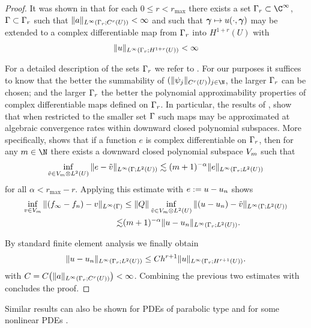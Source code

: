\begin{proof}
	
	It was shown in \cite[Theorem 4.1 \& Section 5]{ChkifaCohenSchwab2015} that for each $0\leq r<r_{\max}$ there exists a set $\domPS_{r}\subset \C^{\infty}$, $\Gamma\subset \Gamma_{r}$ such that
	$\|a\|_{L^{\infty}(\Gamma_{r};C^{r}(U))}<\infty$ and such that $\bm{\gamma}\mapsto u(\cdot,\bm{\gamma})$ may be extended to a complex differentiable map from $\Gamma_{r}$ into $H^{1+r}(U)$ with
		\begin{equation}
		\label{eq:complexbounds}
		\begin{split}
	\|u\|_{L^{\infty}(\Gamma_{r};H^{1+r}(U))}<\infty
		\end{split}
		\end{equation}
	
For a detailed description of the sets $\Gamma_{r}$ we refer to \cite{ChkifaCohenSchwab2015}. For our purposes it suffices to know that the better the summability of $(\norm{\psi_j}{C^{r}(U)})_{j\in\N}$, the larger $\Gamma_{r}$ can be chosen; and the larger $\Gamma_{r}$ the better the polynomial approximability properties of complex differentiable maps defined on $\Gamma_{r}$.
In particular, the results of \cite[Section 2]{ChkifaCohenSchwab2015}, show that when  restricted to the smaller set $\Gamma$ such maps may be approximated at algebraic convergence rates within downward closed polynomial subspaces. More specifically, \cite[Equation (2.27)]{ChkifaCohenSchwab2015} shows that if a function $e$ is complex differentiable on $\Gamma_{r}$, then for any $\dvsp\in\N$ there exists a downward closed polynomial subspace $V_{m}$ such that
	\begin{equation*}
	\begin{split}
	\inf_{\tilde{v}\in V_{m}\otimes L^2(U)}\|e-\tilde{v}\|_{L^\infty(\Gamma;L^2(U))}\lesssim (m+1)^{-\alpha} \|e\|_{L^\infty(\Gamma_{r};L^2(U))}
	\end{split}
	\end{equation*}
	for all $\alpha<r_{\max}- r$. 
 Applying this estimate with $e:=u-u_{n}$ shows
	\begin{equation*}
	\begin{split}
	\inf_{v\in V_{m}}\|(f_{\infty}-f_{n})-v\|_{L^\infty(\Gamma)}&\leq \|Q\|_{} \inf_{\tilde{v}\in V_{m}\otimes L^2(U)}\|(u-u_n)-\tilde{v}\|_{L^\infty(\Gamma;L^2(U))}\\
\lesssim & (m+1)^{-\alpha} \|u-u_{n}\|_{L^\infty(\Gamma_{r};L^2(U))}.
	\end{split}
	\end{equation*}

By standard finite element analysis we finally obtain
\begin{equation*}
\|u-u_{n}\|_{L^{\infty}(\Gamma_{r};L^2(U))}\leq C h^{r+1}\|u\|_{L^{\infty}(\Gamma_{r};H^{r+1}(U))}.
\end{equation*}
with  $C=C\big(	\|a\|_{L^{\infty}(\Gamma_{r};C^{r}(U))}\big)<\infty$. Combining the previous two estimates with  concludes the proof.
\end{proof}

\begin{rem}
	Similar results can also be shown for PDEs of parabolic type and for some nonlinear PDEs \cite{ChkifaCohenSchwab2015}.
\end{rem}